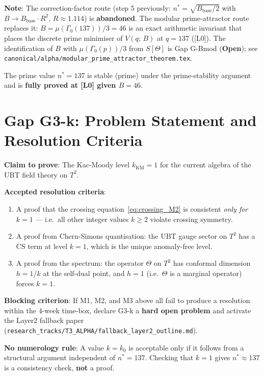\documentclass[12pt,a4paper]{article}
\theoremstyle{definition}
\theoremstyle{remark}
\begin{document}
\textbf{Note}: The correction-factor route (step 5 previously: $n^* = \sqrt{B_{\mathrm{base}}/2}$
with $B \to B_{\mathrm{base}} \cdot R^2$, $R \approx 1.114$) is
\textbf{abandoned}.  The modular prime-attractor route replaces it:
$B = \mu(\Gamma_0(137))/3 = 46$ is an exact arithmetic invariant that places the
discrete prime minimiser of $V(q;\,B)$ at $q = 137$ ([L0]).
The identification of $B$ with $\mu(\Gamma_0(p))/3$ from $S[\Theta]$ is Gap G-Bmod
(\textbf{Open}); see \texttt{canonical/alpha/modular\_prime\_attractor\_theorem.tex}.

The prime value $n^* = 137$ is stable (prime) under the prime-stability
argument and is \textbf{fully proved at [L0] given $B = 46$}.

\section{Gap G3-k: Problem Statement and Resolution Criteria}
\label{sec:gap}

\begin{tcolorbox}[colback=red!4!white,colframe=red!55!black,
  title={\textbf{Gap G3-k}: Formal Statement},breakable]

\textbf{Claim to prove}: The Kac-Moody level $k_{\mathrm{KM}} = 1$ for the
current algebra of the UBT field theory on $T^2$.

\textbf{Accepted resolution criteria}:
\begin{enumerate}
  \item A proof that the crossing equation~\eqref{eq:crossing_M2} is consistent
        \emph{only for $k=1$} — i.e.\ all other integer values $k \geq 2$ violate
        crossing symmetry.
  \item A proof from Chern-Simons quantisation: the UBT gauge sector on $T^2$
        has a CS term at level $k=1$, which is the unique anomaly-free level.
  \item A proof from the spectrum: the operator $\Theta$ on $T^2$ has
        conformal dimension $h = 1/k$ at the self-dual point, and $h = 1$
        (i.e.\ $\Theta$ is a marginal operator) forces $k = 1$.
\end{enumerate}

\textbf{Blocking criterion}: If M1, M2, and M3 above all fail to produce a
resolution within the 4-week time-box, declare G3-k a \textbf{hard open problem}
and activate the Layer2 fallback paper
(\texttt{research\_tracks/T3\_ALPHA/fallback\_layer2\_outline.md}).

\textbf{No numerology rule}: A value $k = k_0$ is acceptable only if it follows
from a structural argument independent of $n^* = 137$.  Checking that $k = 1$
gives $n^* \approx 137$ is a consistency check, \textbf{not} a proof.
\end{tcolorbox}
\end{document}
